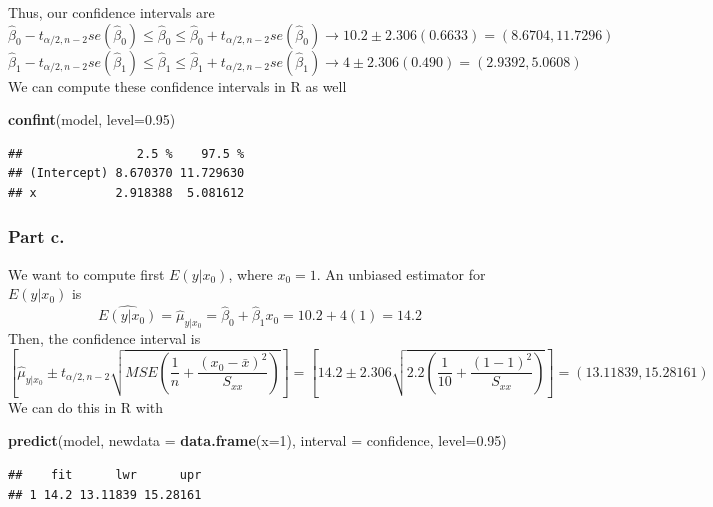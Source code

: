 \documentclass[
  11pt,
]{article}
\newenvironment{Shaded}{\begin{snugshade}}{\end{snugshade}}
\newcommand{\AttributeTok}[1]{\textcolor[rgb]{0.13,0.29,0.53}{#1}}
\newcommand{\DecValTok}[1]{\textcolor[rgb]{0.00,0.00,0.81}{#1}}
\newcommand{\FloatTok}[1]{\textcolor[rgb]{0.00,0.00,0.81}{#1}}
\newcommand{\FunctionTok}[1]{\textcolor[rgb]{0.13,0.29,0.53}{\textbf{#1}}}
\newcommand{\NormalTok}[1]{#1}
\newcommand{\StringTok}[1]{\textcolor[rgb]{0.31,0.60,0.02}{#1}}
\begin{document}
Thus, our confidence intervals are
\[\hat{\beta}_0 - t_{\alpha/2, n-2}se(\hat{\beta}_0) \leq \hat{\beta}_0 \leq \hat{\beta}_0 + t_{\alpha/2, n-2}se(\hat{\beta}_0) \rightarrow 10.2 \pm 2.306(0.6633) = (8.6704 ,11.7296)\]
\[\hat{\beta}_1 - t_{\alpha/2, n-2}se(\hat{\beta}_1) \leq \hat{\beta}_1 \leq \hat{\beta}_1 + t_{\alpha/2, n-2}se(\hat{\beta}_1) \rightarrow 4 \pm 2.306(0.490) = (2.9392,5.0608)\]
We can compute these confidence intervals in R as well

\begin{Shaded}
\begin{Highlighting}[]
\FunctionTok{confint}\NormalTok{(model, }\AttributeTok{level=}\FloatTok{0.95}\NormalTok{)}
\end{Highlighting}
\end{Shaded}

\begin{verbatim}
##                2.5 %    97.5 %
## (Intercept) 8.670370 11.729630
## x           2.918388  5.081612
\end{verbatim}

\subsubsection{Part c.}\label{part-c.}

We want to compute first \(E(y|x_0)\), where \(x_0 = 1\). An unbiased
estimator for \(E(y|x_0)\) is
\[\widehat{E(y|x_0)} = \hat{\mu}_{y|x_0} = \hat{\beta}_0 + \hat{\beta}_1x_0 = 10.2 + 4(1) = 14.2\]
Then, the confidence interval is
\[\left[\hat{\mu}_{y|x_0} \pm t_{\alpha/2, n-2}\sqrt{MSE\left(\frac{1}{n} + \frac{(x_0 - \bar{x})^2}{S_{xx}}\right)} \right] = \left[14.2 \pm 2.306\sqrt{2.2\left(\frac{1}{10} + \frac{(1-1)^2}{S_{xx}}\right)}\right] = (13.11839, 15.28161)\]
We can do this in R with

\begin{Shaded}
\begin{Highlighting}[]
\FunctionTok{predict}\NormalTok{(model, }\AttributeTok{newdata =} \FunctionTok{data.frame}\NormalTok{(}\AttributeTok{x=}\DecValTok{1}\NormalTok{), }\AttributeTok{interval =} \StringTok{\textquotesingle{}confidence\textquotesingle{}}\NormalTok{, }\AttributeTok{level=}\FloatTok{0.95}\NormalTok{)}
\end{Highlighting}
\end{Shaded}

\begin{verbatim}
##    fit      lwr      upr
## 1 14.2 13.11839 15.28161
\end{verbatim}
\end{document}
